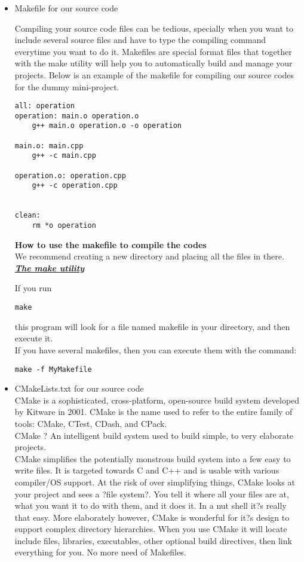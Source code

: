 \documentclass[11pt,utf8]{article}
\begin{document}
\begin{itemize}
\begin{lstlisting}
\end{lstlisting}
 \newpage
\item Makefile for our source code

Compiling your source code files can be tedious, specially when you want to include several source files and have to type the compiling command everytime you want to do it.
Makefiles are special format files that together with the make utility will help you to automatically build and manage your projects.
Below is an example of the makefile for compiling our source codes for the dummy mini-project.
\begin{lstlisting}
all: operation 
operation: main.o operation.o
	g++ main.o operation.o -o operation 

main.o: main.cpp
	g++ -c main.cpp

operation.o: operation.cpp
	g++ -c operation.cpp


clean:
	rm *o operation 
\end{lstlisting}

\textbf{How to use the makefile to compile the codes}\\
We recommend creating a new directory and placing all the files in there.\\
\underline{\textbf{\textit{The make utility}}}

If you run
\begin{lstlisting}
make
\end{lstlisting}
this program will look for a file named makefile in your directory, and then execute it.\\

If you have several makefiles, then you can execute them with the command:\\
\begin{lstlisting}
make -f MyMakefile
\end{lstlisting}

\item CMakeLists.txt  for our source code\\
CMake is a sophisticated, cross-platform, open-source build system developed by Kitware in 2001. CMake is the name used to refer to the entire family of tools: CMake, CTest, CDash, and CPack. \\
CMake ? An intelligent build system used to build simple, to very elaborate projects.\\

CMake simplifies the potentially monstrous build system into a few easy to write files. It is targeted towards C and C++ and is usable with various compiler/OS support. At the risk of over simplifying things, CMake looks at your project and sees a ?file system?. You tell it where all your files are at, what you want it to do with them, and it does it. In a nut shell it?s really that easy. More elaborately however, CMake is wonderful for it?s design to support complex directory hierarchies. When you use CMake it will locate include files, libraries, executables, other optional build directives, then link everything for you. No more need of Makefiles.\\


\end{itemize}
\end{document}
